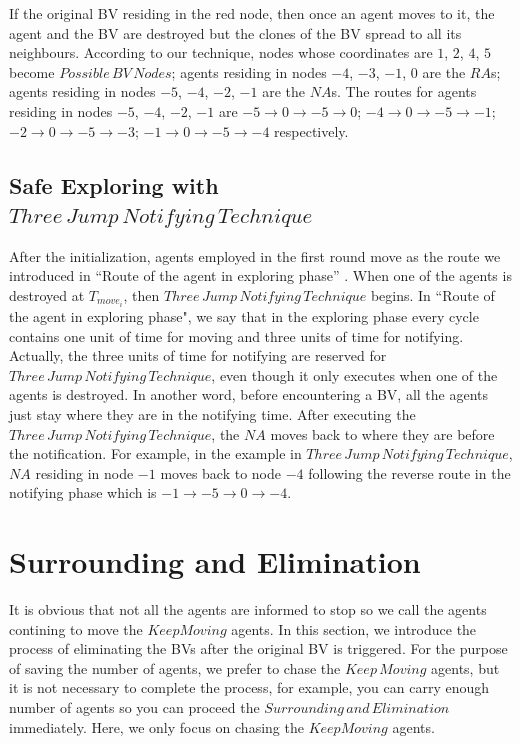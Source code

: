 \documentclass[conference]{IEEEtran}
\begin{document}
If the original BV residing in the red node, then once an agent moves to it, the agent and the BV are destroyed but the clones of the BV spread to all its neighbours. According to our technique, nodes whose coordinates are $1$, $2$, $4$, $5$ become $Possible\,BV\,Nodes$; agents residing in nodes $-4$, $-3$, $-1$, $0$ are the $RA$s; agents residing in nodes $-5$, $-4$, $-2$, $-1$ are the $NA$s. The routes for agents residing in nodes $-5$, $-4$, $-2$, $-1$ are $-5{\rightarrow}0{\rightarrow}-5{\rightarrow}0$; $-4{\rightarrow}0{\rightarrow}-5{\rightarrow}-1$; $-2{\rightarrow}0{\rightarrow}-5{\rightarrow}-3$; $-1{\rightarrow}0{\rightarrow}-5{\rightarrow}-4$ respectively.\\

\subsection{Safe Exploring with $Three\,Jump\,Notifying\,Technique$}

After the initialization, agents employed in the first round move as the route we introduced in ``Route of the agent in exploring phase'' . When one of the agents is destroyed at $T_{move_i}$, then $Three\,Jump\,Notifying\,Technique$ begins. In ``Route of the agent in exploring phase", we say that in the exploring phase every cycle contains one unit of time for moving and three units of time for notifying. Actually, the three units of time for notifying are reserved for $Three\,Jump\,Notifying\,Technique$, even though it only executes when one of the agents is destroyed. In another word, before encountering a BV, all the agents just stay where they are in the notifying time.
After executing the $Three\,Jump\,Notifying\,Technique$, the $NA$ moves back to where they are before the notification. For example, in the example in $Three\,Jump\,Notifying\,Technique$, $NA$ residing in node $-1$ moves back to node $-4$ following the reverse route in the notifying phase which is $-1{\rightarrow}-5{\rightarrow}0{\rightarrow}-4$. 

\section{Surrounding and Elimination}
It is obvious that not all the agents are informed to stop so we call the agents contining to move the $KeepMoving$ agents. In this section, we introduce the process of eliminating the BVs after the original BV is triggered. For the purpose of saving the number of agents, we prefer to chase the $Keep\,Moving$ agents, but it is not necessary to complete the process, for example, you can carry enough number of agents so you can proceed the $Surrounding\,and\,Elimination$ immediately. Here, we only focus on chasing the $KeepMoving$ agents.
\end{document}
